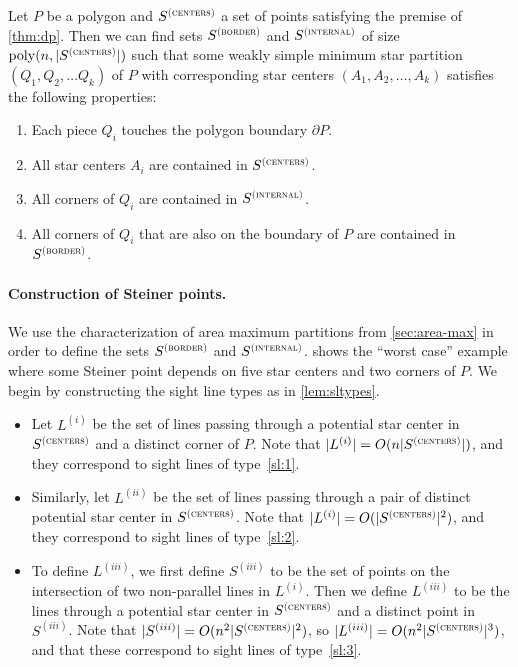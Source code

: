 \documentclass{theoretics}
\newcommand\Scen{S^{\textsc{(centers)}}}
\newcommand\Sint{S^{\textsc{(internal)}}}
\newcommand\Sbor{S^{\textsc{(border)}}}
\newcommand\poly{\mathrm{poly}}
\begin{document}
\begin{lemma}
\label{lem:dp-points}
Let $P$ be a polygon and $\Scen$ a set of points satisfying the premise of \cref{thm:dp}.
Then we can find sets $\Sbor$ and $\Sint$ of size $\poly(n, |\Scen|)$ such that some weakly simple
minimum star partition $(Q_1, Q_2, \ldots Q_k)$ of $P$ with corresponding star centers $(A_1, A_2, \ldots, A_k)$ satisfies the following properties:
\begin{enumerate}
    \item Each piece $Q_i$ touches the polygon boundary $\partial P$.
    \item All star centers $A_i$ are contained in $\Scen$.
    \item All corners of $Q_i$ are contained in $\Sint$. 
    \item All corners of $Q_i$ that are also on the boundary of $P$ are contained in $\Sbor$. 
\end{enumerate}
\end{lemma}

\paragraph{Construction of Steiner points.}
We use the characterization of area maximum partitions from \cref{sec:area-max} in order to define the sets $\Sbor$ and $\Sint$.  shows the ``worst case'' example where some Steiner point depends on five star centers and two corners of $P$.
We begin by constructing the sight line types as in \cref{lem:sltypes}.

\begin{itemize}
\item Let $L^{(i)}$ be the set of lines passing through a potential star center in $\Scen$ and a distinct corner of $P$. Note that $|L^{(i)}| = O(n|\Scen|)$, and they correspond to sight lines of type~\ref{sl:1}.
\item Similarly, let $L^{(ii)}$ be the set of lines passing through a pair of distinct potential star center in $\Scen$. Note that $|L^{(i)}| = O(|\Scen|^2)$, and they correspond to sight lines of type~\ref{sl:2}.
\item To define $L^{(iii)}$, we first define $S^{(iii)}$ to be the set of points on the intersection of two non-parallel lines in $L^{(i)}$.  Then we define $L^{(iii)}$ to be the lines through a potential star center in $\Scen$ and a distinct point in $S^{(iii)}$.
Note that $|S^{(iii)}| = O(n^2|\Scen|^2)$, so $|L^{(iii)}| = O(n^2|\Scen|^3)$, and that these correspond to sight lines of type~\ref{sl:3}.
\end{itemize}
\end{document}
